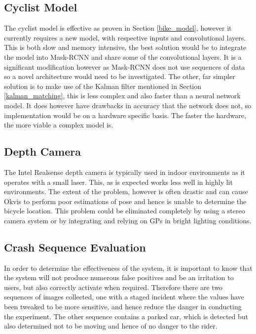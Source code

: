 \documentclass[11pt,twoside]{report}
\begin{document}
\subsection{Cyclist Model}

The cyclist model is effective as proven in Section \ref{bike_model}, however it currently requires a new model, with respective inputs and convolutional layers. This is both slow and memory intensive, the best solution would be to integrate the model into Mask-RCNN and share some of the convolutional layers. It is a significant modification however as Mask-RCNN does not use sequences of data so a novel architecture would need to be investigated.
\newline \newline
The other, far simpler solution is to make use of the Kalman filter mentioned in Section \ref{kalman_matching}, this is less complex and also faster than a neural network model. It does however have drawbacks in accuracy that the network does not, so implementation would be on a hardware specific basis. The faster the hardware, the more viable a complex model is.

\subsection{Depth Camera}

The Intel Realsense depth camera is typically used in indoor environments as it operates with a small laser. This, as is expected works less well in highly lit environments. The extent of the problem, however is often drastic and can cause Okvis to perform poor estimations of pose and hence is unable to determine the bicycle location. This problem could be eliminated completely by using a stereo camera system or by integrating and relying on GPs in bright lighting conditions.

\subsection{Crash Sequence Evaluation}

In order to determine the effectiveness of the system, it is important to know that the system will not produce numerous false positives and be an irritation to users, but also correctly activate when required. Therefore there are two sequences of images collected, one with a staged incident where the values have been tweaked to be more sensitive, and hence reduce the danger in conducting the experiment. The other sequence contains a parked car, which is detected but also determined not to be moving and hence of no danger to the rider.
\end{document}
